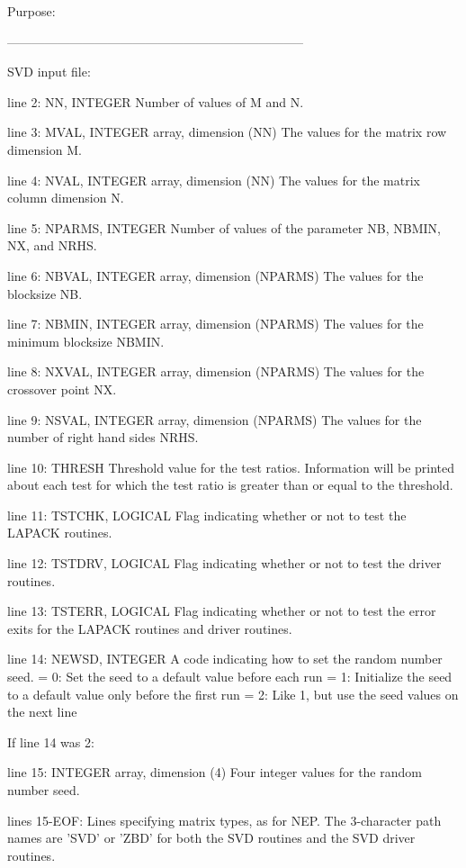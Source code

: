 \begin{DoxyParagraph}{Purpose\+: }
\begin{DoxyVerb}
-----------------------------------------------------------------------

 SVD input file:

 line 2:  NN, INTEGER
          Number of values of M and N.

 line 3:  MVAL, INTEGER array, dimension (NN)
          The values for the matrix row dimension M.

 line 4:  NVAL, INTEGER array, dimension (NN)
          The values for the matrix column dimension N.

 line 5:  NPARMS, INTEGER
          Number of values of the parameter NB, NBMIN, NX, and NRHS.

 line 6:  NBVAL, INTEGER array, dimension (NPARMS)
          The values for the blocksize NB.

 line 7:  NBMIN, INTEGER array, dimension (NPARMS)
          The values for the minimum blocksize NBMIN.

 line 8:  NXVAL, INTEGER array, dimension (NPARMS)
          The values for the crossover point NX.

 line 9:  NSVAL, INTEGER array, dimension (NPARMS)
          The values for the number of right hand sides NRHS.

 line 10: THRESH
          Threshold value for the test ratios.  Information will be
          printed about each test for which the test ratio is greater
          than or equal to the threshold.

 line 11: TSTCHK, LOGICAL
          Flag indicating whether or not to test the LAPACK routines.

 line 12: TSTDRV, LOGICAL
          Flag indicating whether or not to test the driver routines.

 line 13: TSTERR, LOGICAL
          Flag indicating whether or not to test the error exits for
          the LAPACK routines and driver routines.

 line 14: NEWSD, INTEGER
          A code indicating how to set the random number seed.
          = 0:  Set the seed to a default value before each run
          = 1:  Initialize the seed to a default value only before the
                first run
          = 2:  Like 1, but use the seed values on the next line

 If line 14 was 2:

 line 15: INTEGER array, dimension (4)
          Four integer values for the random number seed.

 lines 15-EOF:  Lines specifying matrix types, as for NEP.
          The 3-character path names are 'SVD' or 'ZBD' for both the
          SVD routines and the SVD driver routines.


\end{DoxyVerb}
\end{DoxyParagraph}
